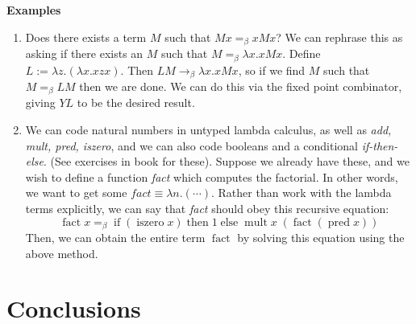 \documentclass[letterpaper]{article}
\newenvironment{examplesNonNum}[1][]{\par\medskip
	\noindent \textbf{Examples}~~~#1 \rmfamily}{\medskip}
\renewcommand{\l}{\lambda}
\newcommand{\beq}{=_\beta}
\newcommand{\betaro}{\rightarrow_\beta}
\DeclareMathOperator{\fact}{fact}
\DeclareMathOperator{\ifT}{if}
\DeclareMathOperator{\iszero}{iszero}
\DeclareMathOperator{\then}{then}
\DeclareMathOperator{\elseT}{else}
\DeclareMathOperator{\mult}{mult}
\DeclareMathOperator{\pred}{pred}
\begin{document}
\begin{examplesNonNum}
	\begin{enumerate}
		\item Does there exists a term $M$ such that $M x \beq x M x$? We can rephrase this as asking if there exists an $M$ such that $M \beq \l x . x M x$. Define $L := \l z . (\l x . x z x)$. Then $LM \betaro \l x . x M x$, so if we find $M$ such that $M \beq L M$ then we are done. We can do this via the fixed point combinator, giving $Y L$ to be the desired result.
		\item We can code natural numbers in untyped lambda calculus, as well as \emph{add, mult, pred, iszero}, and we can also code booleans and a conditional \emph{if-then-else}. (See exercises in book for these). Suppose we already have these, and we wish to define a function \emph{fact} which computes the factorial. In other words, we want to get some $fact \equiv \l n . (\cdots)$. Rather than work with the lambda terms explicitly, we can say that \emph{fact} should obey this recursive equation:
		\[
			\fact x \beq \ifT (\iszero x) \then 1 \elseT \mult x \; (\fact(\pred x))
		\]
		Then, we can obtain the entire term $\fact$ by solving this equation using the above method.
	\end{enumerate}
\end{examplesNonNum}

\section{Conclusions}
\end{document}
